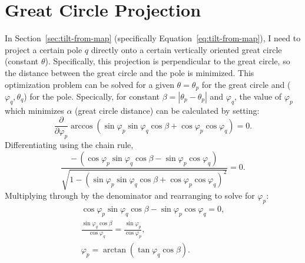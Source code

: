 \section{Great Circle Projection}
In Section~\ref{sec:tilt-from-map} (specifically Equation~\ref{eq:tilt-from-map}), I need to project a certain pole $q$ directly onto a certain vertically oriented great circle (constant $\theta$). Specifically, this projection is perpendicular to the great circle, so the distance between the great circle and the pole is minimized. This optimization problem can be solved for a given $\theta=\theta_p$ for the great circle and ($\varphi_q, \theta_q$) for the pole. Specically, for constant $\beta=|\theta_p-\theta_p|$ and $\varphi_q$, the value of $\varphi_p$ which minimizes $\alpha$ (great circle distance) can be calculated by setting:
\begin{equation}
    \frac{\partial}{\partial \varphi_p}
    \arccos\left(\sin\varphi_p\sin\varphi_q\cos\beta
    +\cos\varphi_p\cos\varphi_q\right)
    =0.
\end{equation}
Differentiating using the chain rule,
\begin{equation}
    \frac{-\,(\cos\varphi_p\sin\varphi_q
    \cos\beta-\sin\varphi_p\cos\varphi_q)}
    {\sqrt{1-{(\sin\varphi_p\sin\varphi_q\cos\beta
    +\cos\varphi_p\cos\varphi_q)}^2}}
    =0.
\end{equation}
Multiplying through by the denominator and rearranging to solve for $\varphi_p$:
\begin{gather}
    \cos\varphi_p\sin\varphi_q
    \cos\beta-\sin\varphi_p\cos\varphi_q
    =0,\nonumber\\
    \frac{\sin\varphi_q
    \cos\beta}
    {\cos\varphi_q}
    =\frac{\sin\varphi_p}{\cos\varphi_p},\nonumber\\
    \varphi_p
    =\arctan(\tan\varphi_q
    \cos\beta).
\end{gather}

